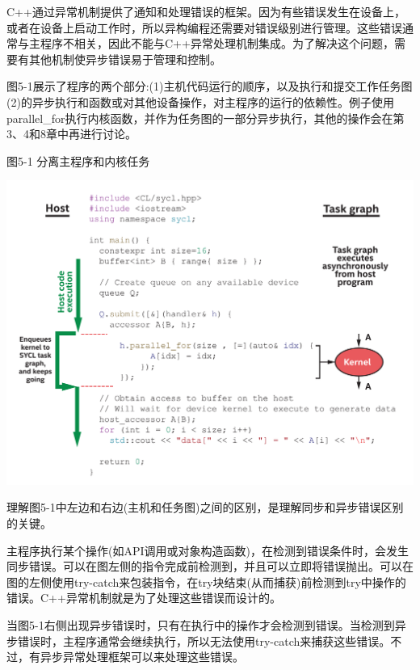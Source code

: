 C++通过异常机制提供了通知和处理错误的框架。因为有些错误发生在设备上，或者在设备上启动工作时，所以异构编程还需要对错误级别进行管理。这些错误通常与主程序不相关，因此不能与C++异常处理机制集成。为了解决这个问题，需要有其他机制使异步错误易于管理和控制。\par

图5-1展示了程序的两个部分:(1)主机代码运行的顺序，以及执行和提交工作任务图(2)的异步执行和函数或对其他设备操作，对主程序的运行的依赖性。例子使用parallel\_for执行内核函数，并作为任务图的一部分异步执行，其他的操作会在第3、4和8章中再进行讨论。\par

\hspace*{\fill} \par %
图5-1 分离主程序和内核任务
\begin{center}
	\includegraphics[width=1.0\textwidth]{content/chapter-5/images/2}
\end{center}

理解图5-1中左边和右边(主机和任务图)之间的区别，是理解同步和异步错误区别的关键。\par

主程序执行某个操作(如API调用或对象构造函数)，在检测到错误条件时，会发生同步错误。可以在图左侧的指令完成前检测到，并且可以立即将错误抛出。可以在图的左侧使用try-catch来包装指令，在try块结束(从而捕获)前检测到try中操作的错误。C++异常机制就是为了处理这些错误而设计的。\par

当图5-1右侧出现异步错误时，只有在执行中的操作才会检测到错误。当检测到异步错误时，主程序通常会继续执行，所以无法使用try-catch来捕获这些错误。不过，有异步异常处理框架可以来处理这些错误。\par










